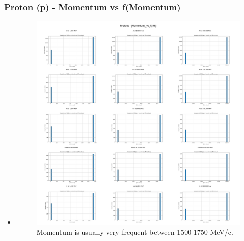 \documentclass[aspectratio-169]{beamer}
\begin{document}
\begin{frame}
\frametitle{Proton (p) - Momentum vs f(Momentum)}
\begin{itemize}
    \item 
    \begin{minipage}{0.5\textwidth}
        \begin{figure}
            \centering
            \includegraphics[width=\textwidth]{Combined Plots/|Momentum|_vs_f(|M|)_p.png}
            \footnotesize{Momentum is usually very frequent between 1500-1750 MeV/c.}
        \end{figure}
    \end{minipage}
\end{itemize}
\end{frame}

\end{document}
